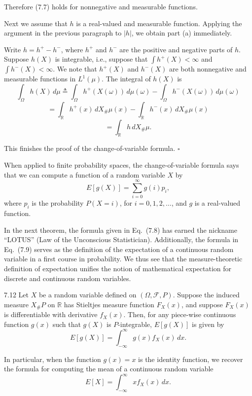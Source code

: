 Therefore (7.7) holds for nonnegative and measurable functions.

Next we assume that $h$ is a real-valued and measurable function. Applying the argument in the previous paragraph to $|h|$, we obtain part (a) immediately.

Write $h=h^+-h^-$, where $h^+$ and $h^-$ are the positive and negative parts of $h$. Suppose $h(X)$ is integrable, i.e., suppose that $\int h^+(X)<\infty$ and $\int h^-(X)<\infty$. We note that $h^+(X)$ and $h^-(X)$ are both nonnegative and measurable functions in $L^1(\mu)$. The integral of $h(X)$ is
\[
\int_{\Omega} h(X)\, d\mu
\triangleq
\int_{\Omega} h^+(X(\omega))\, d\mu(\omega)
-
\int_{\Omega} h^-(X(\omega))\, d\mu(\omega)
\]
\[
=
\int_{\mathbb{R}} h^+(x)\, dX_{\#}\mu(x)
-
\int_{\mathbb{R}} h^-(x)\, dX_{\#}\mu(x)
\]
\[
=
\int_{\mathbb{R}} h\, dX_{\#}\mu.
\]

This finishes the proof of the change-of-variable formula. \hfill $\square$

When applied to finite probability spaces, the change-of-variable formula says that we can compute a function of a random variable $X$ by
\[
E[g(X)] = \sum_{i=0}^{\infty} g(i)p_i,
\]
where $p_i$ is the probability $P(X=i)$, for $i=0,1,2,\dots$, and $g$ is a real-valued function.

In the next theorem, the formula given in Eq.~(7.8) has earned the nickname ``LOTUS'' (Law of the Unconscious Statistician). Additionally, the formula in Eq.~(7.9) serves as the definition of the expectation of a continuous random variable in a first course in probability. We thus see that the measure-theoretic definition of expectation unifies the notion of mathematical expectation for discrete and continuous random variables.

\begin{thmbox}{7.12}
Let $X$ be a random variable defined on $(\Omega,\mathcal{F},P)$. Suppose the induced measure $X_{\#}P$ on $\mathbb{R}$ has Stieltjes measure function $F_X(x)$, and suppose $F_X(x)$ is differentiable with derivative $f_X(x)$. Then, for any piece-wise continuous function $g(x)$ such that $g(X)$ is $P$-integrable, $E[g(X)]$ is given by
\begin{equation}
E[g(X)] = \int_{-\infty}^{\infty} g(x)f_X(x)\, dx.
\tag{7.8}
\end{equation}

In particular, when the function $g(x)=x$ is the identity function, we recover the formula for computing the mean of a continuous random variable
\begin{equation}
E[X] = \int_{-\infty}^{\infty} x f_X(x)\, dx.
\tag{7.9}
\end{equation}
\end{thmbox}

